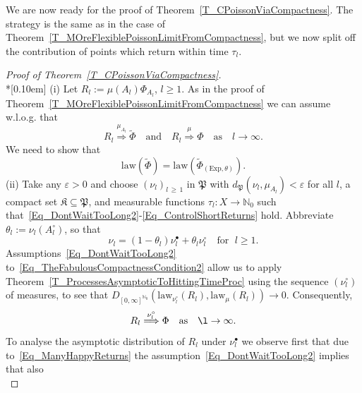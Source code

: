\documentclass[10pt]{amsart}
\theoremstyle{definition}\newtheorem{defi}[theo]{Definition}\newtheorem{rema}[theo]{Remark}\newtheorem{exam}[theo]{Example}\newtheorem{exem}[theo]{Example}\newtheorem{nota}[theo]{Notation}
\newcommand{\Expl}{\mathrm{Exp}}
\newcommand{\law}{\mathrm{law}}
\newcommand{\frkK}{\mathfrak{K}}
\newcommand{\frkP}{\mathfrak{P}}
\newcommand{\bbN}{\mathbb{N}}
\begin{document}
We are now ready for the proof of Theorem~\ref{T_CPoissonViaCompactness}. The strategy is the same as in the case of Theorem~\ref{T_MOreFlexiblePoissonLimitFromCompactness}, but we now split off the contribution of points which return within time $\tau_{l}$.

\begin{proof}[Proof of Theorem~\ref{T_CPoissonViaCompactness}]\ \\*[0.10em]
\noindent (i) Let $R_{l} :=\mu(A_{l})\Phi_{A_{l}}$, $l\geq1$. As in the proof of Theorem~\ref{T_MOreFlexiblePoissonLimitFromCompactness} we can assume w.l.o.g. that
\begin{equation}\label{Eq_AGoodSubSequenceHere}
R_{l}\overset{\mu_{A_{l}}}{\Longrightarrow}\widetilde{\Phi} \quad \text{and}\quad R_{l}\overset{\mu}{\Longrightarrow}\Phi \quad\text{as}\quad l\rightarrow
\infty. 
\end{equation}
We need to show that
\begin{equation}\label{Eq_TheBigPrize}
\law\left(\widetilde{\Phi}\right)=\law\left(\widetilde{\Phi}_{(\Expl,\theta)}\right). 
\end{equation}
(ii) Take any $\varepsilon>0$ and choose $(\nu_{l})_{l\,\geq\,1}$ in $\frkP$ with $d_{\frkP}(\nu_{l},\mu_{A_{l}})<\varepsilon$ for all $l$, a compact set $\frkK\subseteq\frkP$, and measurable functions $\tau_{l}:X\rightarrow\bbN_{0}$ such that~\eqref{Eq_DontWaitTooLong2}-\eqref{Eq_ControlShortReturns} hold. Abbreviate $\theta_{l}:=\nu_{l}(A_{l}^{\circ})$, so that
\begin{equation}\label{Eq_hdhjkahfsakdfSJHFFDH}
\nu_{l}=\left(1-\theta_{l}\right)\nu_{l}^{\bullet}+\theta_{l}\nu_{l}^{\circ} \quad \text{for }\;l\geq1. 
\end{equation}
Assumptions~\eqref{Eq_DontWaitTooLong2} to~\eqref{Eq_TheFabulousCompactnessCondition2} allow us to apply Theorem~\ref{T_ProcessesAsymptoticToHittingTimeProc} using the sequence $(\nu _{l}^{\circ})$ of measures, to see that $D_{[0,\infty]^{\bbN_{0}} }(\law_{\nu_{l}^{\circ}}(R_{l}),\law_{\mu}(R_{l}))\rightarrow0$. Consequently,
\begin{equation}\label{Eq_handiballl}
R_{l}\overset{\nu_{l}^{\circ}}{\Longrightarrow}\Phi \quad\text{as}\quad\l\rightarrow\infty. 
\end{equation}
To analyse the asymptotic distribution of $R_{l}$ under $\nu_{l}^{\bullet}$ we observe first that due to~\eqref{Eq_ManyHappyReturns} the assumption~\eqref{Eq_DontWaitTooLong2} implies that also
\begin{equation}\label{Eq_hjvchgagggggg}

\end{equation}
\end{proof}
\end{document}
